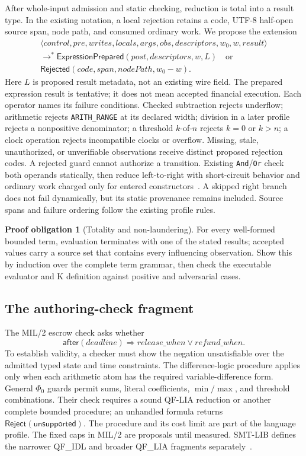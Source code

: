 \documentclass[11pt,a4paper]{article}
\newcommand{\R}{\mathsf{Reject}}
\theoremstyle{definition}
\newtheorem{obligation}{Proof obligation}
\begin{document}
After whole-input admission and static checking, reduction is total into a result type. In the existing notation, a local rejection retains a code, UTF-8 half-open source span, node path, and consumed ordinary work. We propose the extension
\[
\begin{gathered}
\langle control,pre,writes,locals,args,obs,descriptors,w_0,w,result\rangle\\
\longrightarrow^{*}
\mathsf{ExpressionPrepared}(post,descriptors,w,L)
\quad\text{or}\\
\mathsf{Rejected}(code,span,nodePath,w_0-w).
\end{gathered}
\]
Here $L$ is proposed result metadata, not an existing wire field. The prepared expression result is tentative; it does not mean accepted financial execution. Each operator names its failure conditions. Checked subtraction rejects underflow; arithmetic rejects \texttt{ARITH\_RANGE} at its declared width; division in a later profile rejects a nonpositive denominator; a threshold $k$-of-$n$ rejects $k=0$ or $k>n$; a clock operation rejects incompatible clocks or overflow. Missing, stale, unauthorized, or unverifiable observations receive distinct proposed rejection codes. A rejected guard cannot authorize a transition. Existing \texttt{And}/\texttt{Or} check both operands statically, then reduce left-to-right with short-circuit behavior and ordinary work charged only for entered constructors~\cite{CORE,STATIC}. A skipped right branch does not fail dynamically, but its static provenance remains included. Source spans and failure ordering follow the existing profile rules.

\begin{obligation}[Totality and non-laundering]
For every well-formed bounded term, evaluation terminates with one of the stated results; accepted values carry a source set that contains every influencing observation. Show this by induction over the complete term grammar, then check the executable evaluator and K definition against positive and adversarial cases.
\end{obligation}

\subsection{The authoring-check fragment}
The MIL/2 escrow check asks whether
\[
\mathsf{after}(deadline)\Rightarrow release\_when\lor refund\_when.
\]
To establish validity, a checker must show the negation unsatisfiable over the admitted typed state and time constraints. The difference-logic procedure applies only when each arithmetic atom has the required variable-difference form. General $\Phi_0$ guards permit sums, literal coefficients, $\min/\max$, and threshold combinations. Their check requires a sound QF-LIA reduction or another complete bounded procedure; an unhandled formula returns $\R(\mathsf{unsupported})$. The procedure and its cost limit are part of the language profile. The fixed caps in MIL/2 are proposals until measured. SMT-LIB defines the narrower QF\_IDL and broader QF\_LIA fragments separately~\cite{SMTLIB}.
\end{document}
